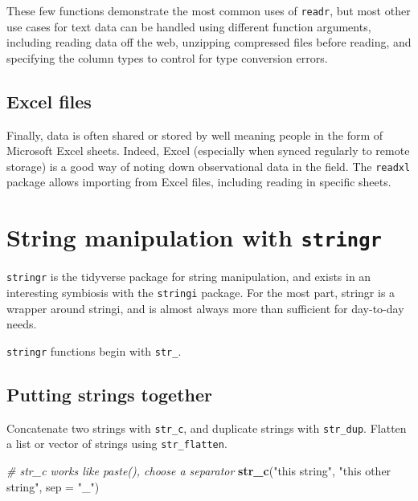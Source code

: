 \documentclass[]{book}
\newenvironment{Shaded}{}{}
\newcommand{\CommentTok}[1]{\textcolor[rgb]{0.38,0.63,0.69}{\textit{#1}}}
\newcommand{\DataTypeTok}[1]{\textcolor[rgb]{0.56,0.13,0.00}{#1}}
\newcommand{\KeywordTok}[1]{\textcolor[rgb]{0.00,0.44,0.13}{\textbf{#1}}}
\newcommand{\NormalTok}[1]{#1}
\newcommand{\StringTok}[1]{\textcolor[rgb]{0.25,0.44,0.63}{#1}}
\begin{document}
These few functions demonstrate the most common uses of \texttt{readr}, but most other use cases for text data can be handled using different function arguments, including reading data off the web, unzipping
compressed files before reading, and specifying the column types to control for type conversion errors.

\hypertarget{excel-files}{%
\subsection*{Excel files}\label{excel-files}}

Finally, data is often shared or stored by well meaning people in the form of Microsoft Excel sheets. Indeed, Excel (especially when synced regularly to remote storage) is a good way of noting down observational data in the field. The \texttt{readxl} package allows importing from Excel files, including reading in specific sheets.

\hypertarget{string-manipulation-with-stringr}{%
\section{\texorpdfstring{String manipulation with \texttt{stringr}}{String manipulation with stringr}}\label{string-manipulation-with-stringr}}

\texttt{stringr} is the tidyverse package for string manipulation, and exists in an interesting symbiosis with the \texttt{stringi} package. For the most part, stringr is a wrapper around stringi, and is almost always more than sufficient for day-to-day needs.

\texttt{stringr} functions begin with \texttt{str\_}.

\hypertarget{putting-strings-together}{%
\subsection{Putting strings together}\label{putting-strings-together}}

Concatenate two strings with \texttt{str\_c}, and duplicate strings with \texttt{str\_dup}. Flatten a list or vector of strings using \texttt{str\_flatten}.

\begin{Shaded}
\begin{Highlighting}[]
\CommentTok{# str_c works like paste(), choose a separator}
\KeywordTok{str_c}\NormalTok{(}\StringTok{"this string"}\NormalTok{, }\StringTok{"this other string"}\NormalTok{, }\DataTypeTok{sep =} \StringTok{"_"}\NormalTok{)}
\end{Highlighting}
\end{Shaded}
\end{document}
